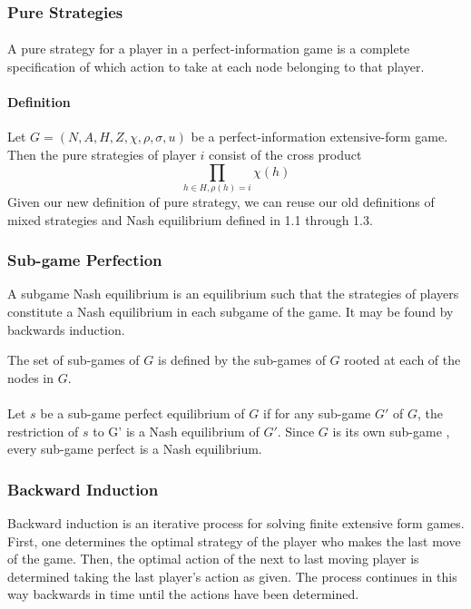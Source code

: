 \subsubsection{Pure Strategies}
\paragraph{} A pure strategy for a player in a perfect-information game is a complete specification of which action to take at each node belonging to that player.
\paragraph{Definition} Let $G = (N, A, H, Z,\chi ,\rho, \sigma, u ) $ be a perfect-information extensive-form game. Then the pure strategies of player $i$ consist of the cross product\\
\begin{equation}
\prod_{h \in H, \rho(h)=i}\chi(h)
\end{equation}
Given our new definition of pure strategy, we can reuse our old definitions of mixed strategies and Nash equilibrium defined in 1.1 through 1.3.
\subsubsection{Sub-game Perfection}
A subgame Nash equilibrium is an equilibrium such that the strategies of players constitute a Nash equilibrium in each subgame of the game. It may be found by backwards induction.
\begin{mydef}\label{def:def555}
The set of sub-games of $G$ is defined by the sub-games of $G$ rooted at each of the nodes in $G$.
\end{mydef}
\paragraph{}Let $s$ be a  sub-game perfect equilibrium of $G$ if for any sub-game $G'$ of $G$, the restriction of $s$ to G' is a Nash equilibrium of $G'$. Since $G$ is its own sub-game , every sub-game perfect is a Nash equilibrium.

\subsubsection{Backward Induction}
Backward induction is an iterative process for solving finite extensive form games. First, one determines the optimal strategy of the player who makes the last move of the game. Then, the optimal action of the next to last moving player is determined taking the last player's action as given. The process continues in this way backwards in time until the actions have been determined.

